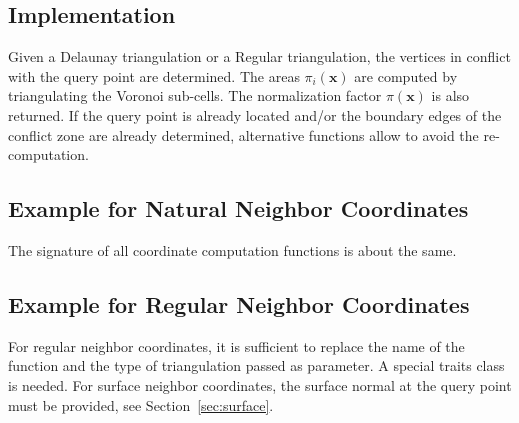 \subsection{Implementation}
Given a Delaunay triangulation or a Regular triangulation, the
vertices in conflict with the query point are determined. The areas
$\pi_i(\mathbf{x})$ are computed by triangulating the Voronoi
sub-cells.  The normalization factor $\pi(\mathbf{x})$ is also
returned. If the query point is already located and/or the boundary
edges of the conflict zone are already determined, alternative
functions allow to avoid the re-computation.

\subsection{Example for Natural Neighbor Coordinates}

The signature of all coordinate computation functions is about the
same.

\subsection{Example for Regular Neighbor Coordinates}
For regular neighbor coordinates, it is sufficient to replace the name
of the function and the type of triangulation passed as parameter. A
special traits class is needed.
For surface neighbor coordinates, the surface normal at the query
point must be provided, see Section~\ref{sec:surface}.
%
